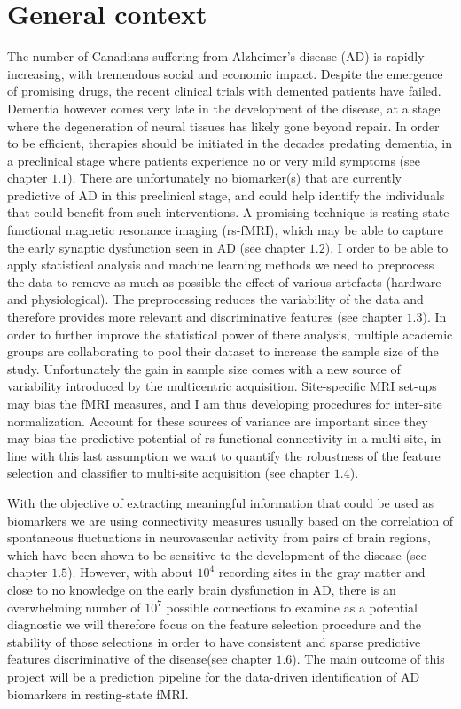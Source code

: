 

\chapter{General context}
The number of Canadians suffering from Alzheimer's disease (AD) is rapidly increasing, with tremendous social and economic impact. Despite the emergence of promising drugs, the recent clinical trials with demented patients have failed. Dementia however comes very late in the development of the disease, at a stage where the degeneration of neural tissues has likely gone beyond repair. In order to be efficient, therapies should be initiated in the decades predating dementia, in a preclinical stage where patients experience no or very mild symptoms (see chapter $1.1$). There are unfortunately no biomarker(s) that are currently predictive of AD in this preclinical stage, and could help identify the individuals that could benefit from such interventions. A promising technique is resting-state functional magnetic resonance imaging (rs-fMRI), which may be able to capture the early synaptic dysfunction seen in AD (see chapter $1.2$). I order to be able to apply statistical analysis and machine learning methods we 
need to preprocess the data to remove as much as possible the effect of various artefacts (hardware and physiological). The preprocessing reduces the variability of the data and therefore provides more relevant and discriminative features (see chapter $1.3$). In order to further improve the statistical power of there analysis, multiple academic groups are collaborating to pool their dataset to increase the sample size of the study. Unfortunately the gain in sample size comes with a new source of variability introduced by the multicentric acquisition. Site-specific MRI set-ups may bias the fMRI measures, and I am thus developing procedures for inter-site normalization. Account for these sources of variance are important since they may bias the predictive potential of rs-functional connectivity in a multi-site, in line with this last assumption we want to quantify the robustness of the feature selection and classifier to multi-site acquisition (see chapter $1.4$).

With the objective of extracting meaningful information that could be used as biomarkers we are using connectivity measures usually based on the correlation of spontaneous fluctuations in neurovascular activity from pairs of brain regions, which have been shown to be sensitive to the development of the disease (see chapter $1.5$). However, with about $10^4$ recording sites in the gray matter and close to no knowledge on the early brain dysfunction in AD, there is an overwhelming number of $10^7$ possible connections to examine as a potential diagnostic we will therefore focus on the feature selection procedure and the stability of those selections in order to have consistent and sparse predictive features discriminative of the disease(see chapter $1.6$). The main outcome of this project will be a prediction pipeline for the data-driven identification of AD biomarkers in resting-state fMRI.

